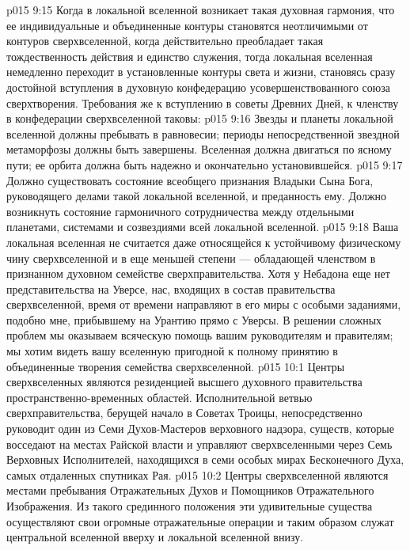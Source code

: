 \vs p015 9:15 \pc Когда в локальной вселенной возникает такая духовная гармония, что ее индивидуальные и объединенные контуры становятся неотличимыми от контуров сверхвселенной, когда действительно преобладает такая тождественность действия и единство служения, тогда локальная вселенная немедленно переходит в установленные контуры света и жизни, становясь сразу достойной вступления в духовную конфедерацию усовершенствованного союза сверхтворения. Требования же к вступлению в советы Древних Дней, к членству в конфедерации сверхвселенной таковы:
\vs p015 9:16 \bibnobreakspace {} Звезды и планеты локальной вселенной должны пребывать в равновесии; периоды непосредственной звездной метаморфозы должны быть завершены. Вселенная должна двигаться по ясному пути; ее орбита должна быть надежно и окончательно установившейся.
\vs p015 9:17 \bibnobreakspace {} Должно существовать состояние всеобщего признания Владыки Сына Бога, руководящего делами такой локальной вселенной, и преданность ему. Должно возникнуть состояние гармоничного сотрудничества между отдельными планетами, системами и созвездиями всей локальной вселенной.
\vs p015 9:18 \pc Ваша локальная вселенная не считается даже относящейся к устойчивому физическому чину сверхвселенной и в еще меньшей степени --- обладающей членством в признанном духовном семействе сверхправительства. Хотя у Небадона еще нет представительства на Уверсе, нас, входящих в состав правительства сверхвселенной, время от времени направляют в его миры с особыми заданиями, подобно мне, прибывшему на Урантию прямо с Уверсы. В решении сложных проблем мы оказываем всяческую помощь вашим руководителям и правителям; мы хотим видеть вашу вселенную пригодной к полному принятию в объединенные творения семейства сверхвселенной.
\vs p015 10:1 Центры сверхвселенных являются резиденцией высшего духовного правительства пространственно\hyp{}временных областей. Исполнительной ветвью сверхправительства, берущей начало в Советах Троицы, непосредственно руководит один из Семи Духов\hyp{}Мастеров верховного надзора, существ, которые восседают на местах Райской власти и управляют сверхвселенными через Семь Верховных Исполнителей, находящихся в семи особых мирах Бесконечного Духа, самых отдаленных спутниках Рая.
\vs p015 10:2 Центры сверхвселенной являются местами пребывания Отражательных Духов и Помощников Отражательного Изображения. Из такого срединного положения эти удивительные существа осуществляют свои огромные отражательные операции и таким образом служат центральной вселенной вверху и локальной вселенной внизу.
